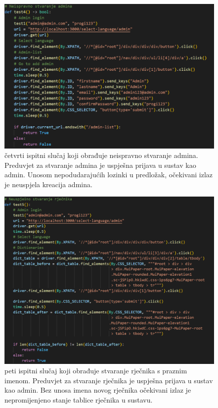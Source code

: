 \begin{figure}[htp]
    \includegraphics[scale=0.5]{dijagrami/test4.png}
    \centering
    \caption{četvrti ispitni slučaj koji obrađuje neispravno stvaranje admina. Preduvjet za stvaranje admina je uspješna prijava u sustav kao admin. Unosom nepodudarajućih lozinki u predložak, očekivani izlaz je neuspjela kreacija admina.}

\end{figure}

\begin{figure}[htp]
    \includegraphics[scale=0.5]{dijagrami/test5.png}
    \centering
    \caption{peti ispitni slučaj koji obrađuje stvaranje rječnika s praznim imenom. Preduvjet za stvaranje rječnika je uspješna prijava u sustav kao admin. Bez unosa imena novog rječnika očekivani izlaz je nepromijenjeno stanje tablice rječnika u sustavu.}

\end{figure}

